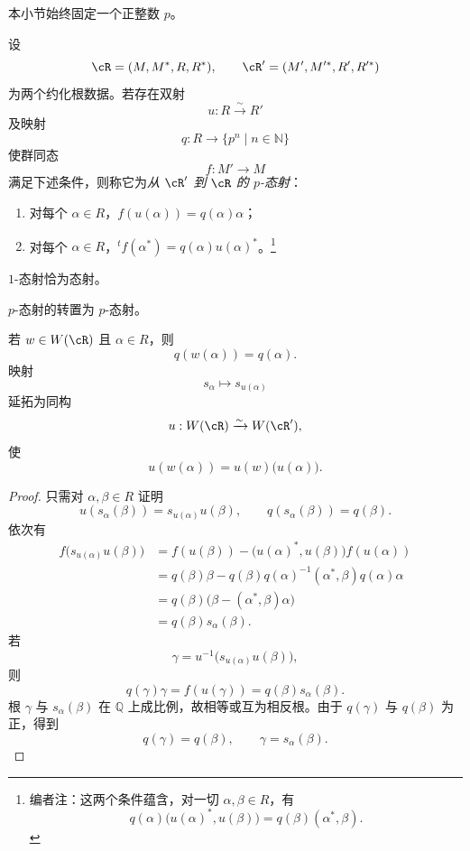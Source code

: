 本小节始终固定一个正整数 \(p\)。

\begin{definition}\label{sga3:XXI:6.8.1}
设
\[
 \cR=(M,M^\ast,R,R^\ast),
 \qquad
 \cR'=(M',M'^\ast,R',R'^\ast)
\]
为两个约化根数据。若存在双射
\[
 u:R\xrightarrow{\sim}R'
\]
及映射
\[
 q:R\longrightarrow\{p^n\mid n\in\mathbb N\}
\]
使群同态
\[
 f:M'\longrightarrow M
\]
满足下述条件，则称它为\emph{从 \(\cR'\) 到 \(\cR\) 的 \(p\)-态射}：
\begin{enumerate}
\item[(i)] 对每个 \(\alpha\in R\)，\(f(u(\alpha))=q(\alpha)\alpha\)；
\item[(ii)] 对每个 \(\alpha\in R\)，\({}^tf(\alpha^\ast)=q(\alpha)u(\alpha)^\ast\)。\footnote{编者注：这两个条件蕴含，对一切 \(\alpha,\beta\in R\)，有
  \[
   q(\alpha)\bigl(u(\alpha)^\ast,u(\beta)\bigr)
   =q(\beta)(\alpha^\ast,\beta).
  \]}
\end{enumerate}
\end{definition}

\begin{corollary}\label{sga3:XXI:6.8.2}
\(1\)-态射恰为态射。
\end{corollary}

\begin{corollary}\label{sga3:XXI:6.8.3}
\(p\)-态射的转置为 \(p\)-态射。
\end{corollary}

\begin{lemma}\label{sga3:XXI:6.8.4}
若 \(w\in W(\cR)\) 且 \(\alpha\in R\)，则
\[
 q(w(\alpha))=q(\alpha).
\]
映射
\[
 s_\alpha\longmapsto s_{u(\alpha)}
\]
延拓为同构
\[
 u:W(\cR)\xrightarrow{\sim}W(\cR'),
\]
使
\[
 u(w(\alpha))=u(w)\bigl(u(\alpha)\bigr).
\]
\end{lemma}

\begin{proof}
只需对 \(\alpha,\beta\in R\) 证明
\[
 u(s_\alpha(\beta))=s_{u(\alpha)}u(\beta),
 \qquad
 q(s_\alpha(\beta))=q(\beta).
\]
依次有
\begin{align*}
 f\bigl(s_{u(\alpha)}u(\beta)\bigr)
  &=f(u(\beta))
    -\bigl(u(\alpha)^\ast,u(\beta)\bigr)f(u(\alpha))\\
  &=q(\beta)\beta
    -q(\beta)q(\alpha)^{-1}
       (\alpha^\ast,\beta)q(\alpha)\alpha\\
  &=q(\beta)\bigl(\beta-(\alpha^\ast,\beta)\alpha\bigr)\\
  &=q(\beta)s_\alpha(\beta).
\end{align*}
若
\[
 \gamma=u^{-1}\bigl(s_{u(\alpha)}u(\beta)\bigr),
\]
则
\[
 q(\gamma)\gamma=f(u(\gamma))=q(\beta)s_\alpha(\beta).
\]
根 \(\gamma\) 与 \(s_\alpha(\beta)\) 在 \(\mathbb Q\) 上成比例，故相等或互为相反根。由于 \(q(\gamma)\) 与 \(q(\beta)\) 为正，得到
\[
 q(\gamma)=q(\beta),
 \qquad
 \gamma=s_\alpha(\beta).
\]
\end{proof}

